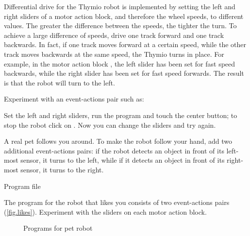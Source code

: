Differential drive for the Thymio robot is implemented by setting the
left and right sliders of a motor action block, and therefore the wheel
speeds, to different values. The greater the difference between the
speeds, the tighter the turn. To achieve a large difference of speeds,
drive one track forward and one track backwards. In fact, if one
track moves forward at a certain speed, while the other track moves
backwards at the same speed, the Thymio turns in place. For example, in
the motor action block , the left slider has been
set for fast speed backwards, while the right slider has been set for
fast speed forwards. The result is that the robot will turn to the left.

Experiment with an event-actions pair such as: 

Set the left and right sliders, run the program and touch the center
button; to stop the robot click on . Now you can change the
sliders and try again.



A real pet follows you around. To make the robot follow your hand, add
two additional event-actions pairs: if the robot detects an object in
front of its left-most sensor, it turns to the left, while if it detects
an object in front of its right-most sensor, it turns to the right.
                                                       
{\raggedleft \hfill Program file }

The program for the robot that likes you consists of two event-actions
pairs (\cref{fig.likes}). Experiment with the sliders on each motor
action block.

\begin{figure}
	\hfill
	\caption{Programs for pet robot}
\end{figure}


